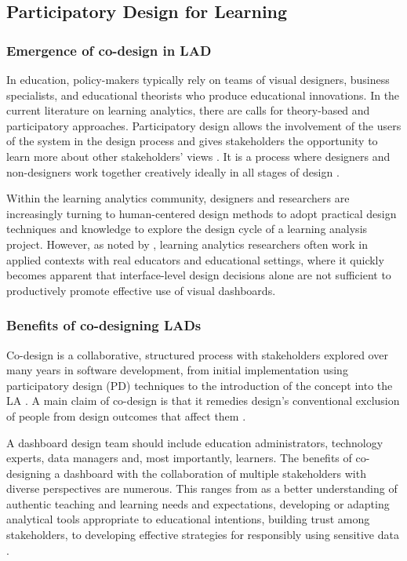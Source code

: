 \documentclass[manuscript,screen,nonacm,12pt]{acmart}
\begin{document}
\subsection{Participatory Design for Learning}
\subsubsection{Emergence of co-design in LAD}
In education, policy-makers typically rely on teams of visual designers, business specialists, and educational theorists who produce educational innovations. 
In the current literature on learning analytics, there are calls for theory-based and participatory approaches. Participatory design allows the involvement of the users of the system in the design process and gives stakeholders the opportunity to learn more about other stakeholders' views \cite{unger2013designing}. It is a process where designers and non-designers work together creatively ideally in all stages of design 
\cite{Sanders2008}. 

Within the learning analytics community, designers and researchers are increasingly turning to human-centered design methods to adopt practical design techniques and knowledge to explore the design cycle of a learning analysis project. 
However, as noted by \citet{dollinger2018co}, learning analytics researchers often work in applied contexts with real educators and educational settings, where it quickly becomes apparent that interface-level design decisions alone are not sufficient to productively promote effective use of visual dashboards. 


\subsubsection{Benefits of co-designing LADs}
Co-design is a collaborative, structured process with stakeholders explored over many years in software development, from initial implementation using participatory design (PD) techniques to the introduction of the concept into the LA \cite{prieto2020engaging}.
A main claim of co-design is that it remedies design’s conventional exclusion of people from design outcomes that affect them \cite{taffe2015hybrid}. 

A dashboard design team should include education administrators, technology experts, data managers and, most importantly, learners. The benefits of co-designing a dashboard with the collaboration of multiple stakeholders with diverse perspectives are numerous. 
This ranges from as a better understanding of authentic teaching and learning needs and expectations, developing or adapting analytical tools appropriate to educational intentions, building trust among stakeholders, to developing effective strategies for responsibly using sensitive data \cite{beattie2014creepy}.
\end{document}
